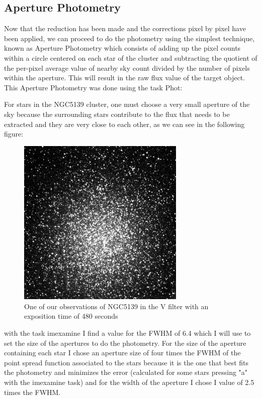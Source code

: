 \subsection{Aperture Photometry}

Now that the reduction has been made and the corrections pixel by pixel have been applied, we can proceed to do the photometry using the simplest technique, known as Aperture Photometry which consists of adding up the pixel counts within a circle centered on each star of the cluster and subtracting the quotient of the per-pixel average value of nearby sky count divided by the number of pixels within the aperture. This will result in the raw flux value of the target object. This Aperture Photometry was done using the task Phot:

For stars in the NGC5139 cluster, one must choose a very small aperture of the sky because the surrounding stars contribute to the flux that needs to be extracted and they are very close to each other, as we can see in the following figure: 

\begin{figure}[H]
\centering
\includegraphics[width=8cm]{images/NGC5139_red.png}
\caption{One of our observations of NGC5139 in the V filter with an exposition time of 480 seconds}
\end{figure}

with the task imexamine I find a value for the FWHM of 6.4 which I will use to set the size of the apertures to do the photometry. For the size of the aperture containing each star I chose an aperture size of four times the FWHM of the point spread function associated to the stars because it is the one that best fits the photometry and minimizes the error (calculated for some stars pressing "a" with the imexamine task) and for the width of the aperture I chose I value of 2.5 times the FWHM.

